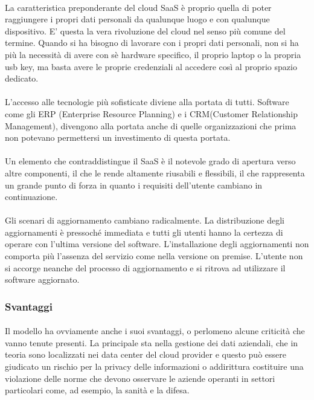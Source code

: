 \paragraph{}
La caratteristica preponderante del cloud SaaS è proprio quella di poter raggiungere i propri dati personali da qualunque luogo e con qualunque dispositivo. E' questa la vera rivoluzione del cloud nel senso più comune del termine. Quando si ha bisogno di lavorare con i propri dati personali, non si ha più la necessità di avere con sè hardware specifico, il proprio laptop o la propria usb key, ma basta avere le proprie credenziali al accedere così al proprio spazio dedicato. 
\paragraph{}
L'accesso alle tecnologie più sofisticate diviene alla portata di tutti. Software come gli ERP (Enterprise Resource Planning) e i CRM(Customer Relationship Management), divengono alla portata anche di quelle organizzazioni che prima non potevano permettersi un investimento di questa portata.
\paragraph{} 
Un elemento che contraddistingue il SaaS è il notevole grado di apertura verso altre componenti, il che le rende altamente riusabili e flessibili, il che rappresenta un grande punto di forza in quanto i requisiti dell'utente cambiano in continuazione.
\paragraph{}
Gli scenari di aggiornamento cambiano radicalmente. La distribuzione degli aggiornamenti è pressoché immediata e tutti gli utenti hanno la certezza di operare con l'ultima versione del software. L'installazione degli aggiornamenti non comporta più l'assenza del servizio come nella versione on premise. L'utente non si accorge neanche del processo di aggiornamento e si ritrova ad utilizzare il software aggiornato.
\subsubsection{Svantaggi}
\paragraph{}
Il modello ha ovviamente anche i suoi svantaggi, o perlomeno alcune criticità che vanno tenute presenti. La principale sta nella gestione dei dati aziendali, che in teoria sono localizzati nei data center del cloud provider e questo può essere giudicato un rischio per la privacy delle informazioni o addirittura costituire una violazione delle norme che devono osservare le aziende operanti in settori particolari come, ad esempio, la sanità e la difesa.
